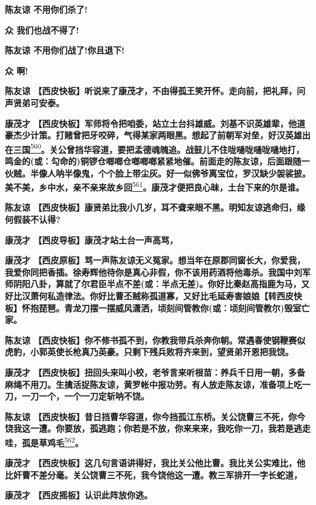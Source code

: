 \textbf{陈友谅 不用你们杀了!}

\textbf{众 我们也战不得了!}

\textbf{陈友谅 不用你们战了!你且退下!}

\textbf{众 啊!}

\textbf{陈友谅
【西皮快板】听说来了康茂才，不由得孤王笑开怀。走向前，把礼拜，问声贤弟可安泰。}

\textbf{康茂才
【西皮快板】军师将令把咱委，站立土台抖雄威。刘基不识英雄辈，他道豪杰少计策。打赌曾把牙咬碎，气得某家两眼黑。想起了前朝军对垒，好汉英雄出在三国}\protect\hyperlink{fn560}{\textsuperscript{560}}\textbf{。关公曾挡华容道，要把孟德魂魄追。战鼓儿不住咙嗵咙嗵咙嗵地打，鸣金的(或：勾命的)铜锣仓啷啷仓啷啷啷紧紧地催。前面走的陈友谅，后面跟随一伙贼。半像人呐半像鬼，个个脸上带尘灰。好一似佛爷离宝位，罗汉缺少袈裟披。美不美，乡中水，亲不亲来故乡回}\protect\hyperlink{fn561}{\textsuperscript{561}}\textbf{。康茂才便把良心昧，土台下来的尔是谁。}

\textbf{陈友谅
【西皮快板】康贤弟比我小几岁，耳不聋来眼不黑。明知友谅逃命归，缘何假装不认得?}

\textbf{康茂才 【西皮导板】康茂才站土台一声高骂，}

\textbf{康茂才
【西皮原板】骂一声陈友谅无义冤家。想当年在原郡同窗长大，你爱我，我爱你同把香插。徐寿辉他待你是真心非假，你不该用药酒将他毒杀。我国中刘军师阴阳八卦，算就了尔君臣半点不差(或：半点无差)。你好比秦赵高指鹿为马，又好比汉萧何私造律法。你好比曹丕贼称孤道寡，又好比毛延寿害娘娘【转西皮快板】怀抱琵琶。青龙刀摆一摆威风潇洒，顷刻间管教你(或：顷刻间管教尔)毁室亡家。}

\textbf{陈友谅
【西皮快板】你不修书孤不到，你教我带兵杀奔你朝。常遇春使钢鞭赛似虎豹，小郭英使长枪真乃英豪。只剩下残兵败将齐来到，望贤弟开恩把我饶。}

\textbf{康茂才
【西皮快板】扭回头来叫小校，老爷言来听根苗：养兵千日用一朝，多备麻绳不用刀。生擒活捉陈友谅，黄罗帐中报功劳。有人放走陈友谅，准备项上吃一刀，一刀一个，一个一刀定斩呐不饶。}

\textbf{陈友谅
【西皮快板】昔日挡曹华容道，你今挡孤江东桥。关公饶曹三不死，你今饶我这一遭。你要放，孤逃跑；你若是不放，你来来来，我吃你一刀，我若是逃走哇，孤是草鸡毛}\protect\hyperlink{fn562}{\textsuperscript{562}}\textbf{。}

\textbf{康茂才
【西皮快板】这几句言语讲得好，我比关公他比曹。我比关公实难比，他比奸曹不差分毫。关公饶曹三不死，我今饶他这一遭。教三军排开一字长蛇道，}

\textbf{康茂才 【西皮摇板】认识此阵放你逃。}

